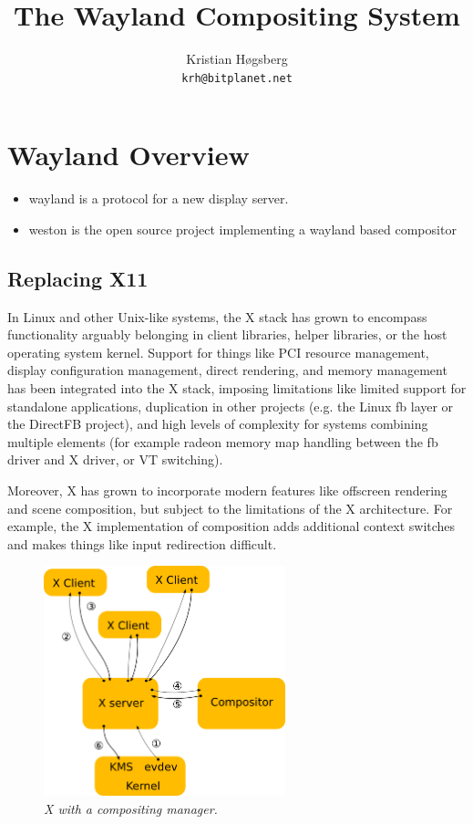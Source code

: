 \documentclass{article}
\author{Kristian Høgsberg\\
\texttt{krh@bitplanet.net}
}
\title{The Wayland Compositing System}
\begin{document}
\maketitle

\section{Wayland Overview}

\begin{itemize}
\item wayland is a protocol for a new display server.
\item weston is the open source project implementing a wayland based compositor
\end{itemize}

\subsection{Replacing X11}

In Linux and other Unix-like systems, the X stack has grown to
encompass functionality arguably belonging in client libraries,
helper libraries, or the host operating system kernel.  Support for
things like PCI resource management, display configuration management,
direct rendering, and memory management has been integrated into the X
stack, imposing limitations like limited support for standalone
applications, duplication in other projects (e.g. the Linux fb layer
or the DirectFB project), and high levels of complexity for systems
combining multiple elements (for example radeon memory map handling
between the fb driver and X driver, or VT switching).

Moreover, X has grown to incorporate modern features like offscreen
rendering and scene composition, but subject to the limitations of the
X architecture.  For example, the X implementation of composition adds
additional context switches and makes things like input redirection
difficult.

\begin{figure}
\begin{center}
\includegraphics[width=70mm]{x-architecture.png}
\caption{\small \sl X with a compositing manager.\label{fig:X architecture}}
\end{center}
\end{figure}
\end{document}
